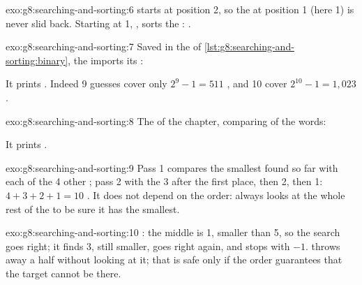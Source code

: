 \begin{solution}{exo:g8:searching-and-sorting:6}
 starts at position 2, so the  at position 1
(here 1) is never slid back. Starting at 1, ,
sorts the : \code{[1, 3, 5]}.
\end{solution}

\begin{solution}{exo:g8:searching-and-sorting:7}
Saved in the  of \cref{lst:g8:searching-and-sorting:binary}, the 
imports its :

\label{lst:g8:searching-and-sorting:sol-max}

It prints . Indeed 9 guesses cover
only $2^9 - 1 = 511$ , and 10 cover $2^{10} - 1 = 1{,}023$.
\end{solution}

\begin{solution}{exo:g8:searching-and-sorting:8}
The  of the chapter, comparing  of the words:

\label{lst:g8:searching-and-sorting:sol-length}

It prints .
\end{solution}

\begin{solution}{exo:g8:searching-and-sorting:9}
Pass 1 compares the smallest found so far with each of the 4 other
; pass 2 with the 3 after the first place, then 2, then 1: $4 + 3 + 2 + 1 = 10$ . It does not depend on the
order:  always looks at the whole rest of the  to be sure
it has the smallest.
\end{solution}

\begin{solution}{exo:g8:searching-and-sorting:10}
\code{[5, 1, 3]}: the middle  is 1, smaller than 5, so the search goes
right; it finds 3, still smaller, goes right again, and stops with $-1$.  throws away a half without looking at it; that is safe only if the
order guarantees that the target cannot be there.
\end{solution}

